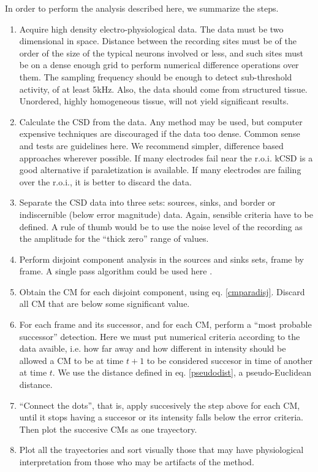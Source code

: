 \documentclass{article}
\begin{document}
 In order to perform the analysis described here, we summarize the steps.
 \begin{enumerate}
 \item Acquire high density electro-physiological data. The data must be two dimensional in space. Distance between the recording sites must be of the order of the size of the typical neurons involved or less, and such sites must be on a dense enough grid to perform numerical difference operations over them. The sampling frequency should be enough to detect sub-threshold activity, of at least 5kHz. Also, the data should come from structured tissue. Unordered, highly homogeneous tissue, will not yield significant results. 
 \item Calculate the CSD from the data. Any method may be used, but computer expensive techniques are discouraged if the data too dense. Common sense and tests are guidelines here. We recommend simpler, difference based approaches wherever possible. If many electrodes fail near the r.o.i. kCSD is a good alternative if paraletization is available.  If many electrodes are failing over the r.o.i., it is better to discard the data. 
\item Separate the CSD data into three sets: sources, sinks, and border or indiscernible (below error magnitude) data. Again, sensible criteria have to be defined. A rule of thumb would be to use the noise level of the recording as the amplitude for the ``thick zero'' range of values. 
\item Perform disjoint component analysis in the sources and sinks sets, frame by frame.
  A single pass algorithm could be used here \cite{Vincent91, Abubaker07}.
\item  Obtain the CM for each disjoint component, using eq. \ref{cmparadisj}. Discard
  all CM that are below some significant value. 
\item For each frame and its successor, and for each CM, perform a ``most probable successor'' detection. Here we must put numerical criteria according to the data avaible, i.e. how far away and how different in intensity should be allowed a CM to be at time $t+1$ to be considered succesor in time of another at time $t$. We use the distance defined in eq. \ref{pseudodist}, a pseudo-Euclidean distance. 
\item ``Connect the dots'', that is, apply succesively the step above for each CM, until it stops having a succesor or its intensity falls below the error criteria. Then plot the succesive CMs as one trayectory.
\item Plot all the trayectories and sort visually those that may have physiological interpretation from those who may be artifacts of the method. 
\end{enumerate}
\end{document}
